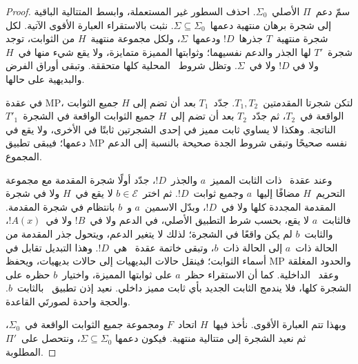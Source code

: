 \documentclass[../../../include/open-logic-section]{subfiles}
\begin{document}
\begin{proof}
سمّ دعم~$\Pi$ الأصلي~$\Sigma_0$. احذف السطور غير المستعملة، وابسط
المتتالية الباقية إلى شجرة برهان منتهية دعمها~$\Sigma\subseteq\Sigma_0$.
نثبت بالاستقراء العبارة الأقوى الآتية. لكل شجرة منتهية~$T$ جذرها~$!D$
ودعمها~$\Sigma$، ولكل مجموعة منتهية~$H$ من الثوابت، توجد شجرة~$T'$
لها الجذر والدعم نفسيهما؛ وثوابتها المميزة متمايزة، ولا يقع شيء منها في~$H$ ولا في
$!D$ ولا في~$\Sigma$. وتظل شروط~\QR{} المحلية كلها متحققة. وتبقى
أوراق الفرض والبديهية على حالها.

في عقدة MP، لتكن شجرتا المقدمتين~$T_1,T_2$. جدّد~$T_1$ بعد أن تضم إلى
$H$ جميع الثوابت الواقعة في~$T_2$، ثم جدّد~$T_2$ بعد أن تضم إلى~$H$
جميع الثوابت الواقعة في الشجرة~$T'_1$ الناتجة. وهكذا لا يساوي ثابت مميز
في إحدى الشجرتين ثابتًا في الأخرى، ولا يقع في دعمها؛ فيبقى تطبيق MP نفسه
صحيحًا وتبقى شروط الجدة صحيحة بالنسبة إلى الدعم المجموع.

وعند عقدة~\QR{} ذات الثابت المميز~$a$ والجذر~$!D$، جدّد أولًا شجرة
المقدمة مع مجموعة التحريم~$H$ مضافًا إليها~$a$ وجميع ثوابت~$!D$.
ثم اختر~$b\in\mathcal E$ لا يقع في~$H$ ولا في شجرة المقدمة المجددة
كلها ولا في~$!D$، وبدّل الاسمين~$a$ و~$b$ بانتظام في شجرة المقدمة.
فالثابت~$a$ لا يقع، بحسب شرط التطبيق الأصلي، في الدعم ولا في~$!B$ ولا
في~$!A(x)$، والثابت~$b$ لم يكن واقعًا في الشجرة؛ لذلك لا يتغير الدعم،
ويتحول جذر المقدمة من الحالة ذات~$a$ إلى الحالة ذات~$b$، وتبقى خاتمة
عقدة~\QR{} هي~$!D$. وهذا التبديل تقابل في أسماء الثوابت؛ فينقل حالات
البديهيات إلى حالات بديهيات، ويحفظ MP والحدود المغلقة وعقد~\QR{}
الداخلية. كما أن الاستقراء حظر~$a$ على ثوابتها المميزة، واختيار~$b$
حظره على الشجرة كلها، فلا يندمج الثابت الجديد بأي ثابت مميز داخلي.
نعيد إذن تطبيق~\QR{} بالثابت~$b$. والحجة واحدة لصورتَي القاعدة.

وبهذا تتم العبارة الأقوى. نأخذ فيها~$H$ اتحاد~$F$ ومجموعة جميع الثوابت
الواقعة في~$\Sigma_0$، ثم نعيد الشجرة إلى متتالية منتهية. فيكون دعمها
$\Sigma\subseteq\Sigma_0$، ونتحصل على~$\Pi'$ المطلوبة.
\end{proof}
\end{document}
